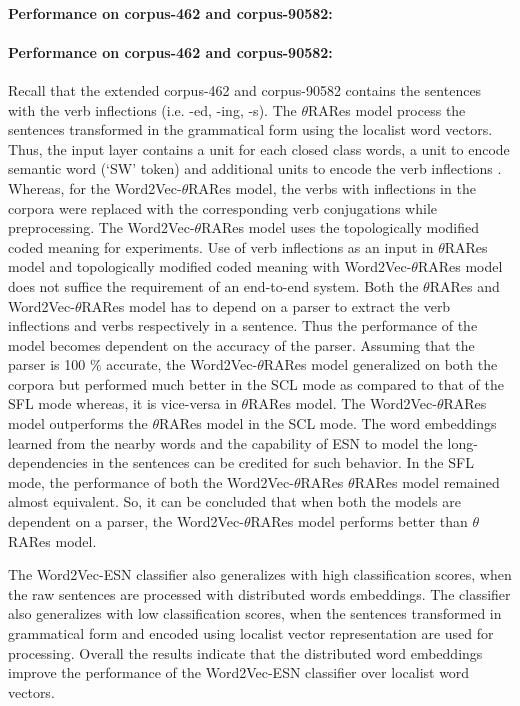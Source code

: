 \paragraph{Performance on corpus-462 and corpus-90582:} \paragraph{Performance on corpus-462 and corpus-90582:} Recall that the extended corpus-462 and corpus-90582 contains the sentences with the verb inflections (i.e. -ed, -ing, -s). The $\theta$RARes model process the sentences transformed in the grammatical form using the localist word vectors. Thus, the input layer contains a unit for each closed class words, a unit to encode semantic word (`SW' token) and additional units to encode the verb inflections \cite{xavier:2013:RT}. Whereas, for the Word2Vec-$\theta$RARes model, the verbs with inflections in the corpora were replaced with the corresponding verb conjugations while preprocessing. The Word2Vec-$\theta$RARes model uses the topologically modified coded meaning for experiments. Use of verb inflections as an input in $\theta$RARes model and topologically modified coded meaning with Word2Vec-$\theta$RARes model does not suffice the requirement of an end-to-end system. Both the $\theta$RARes and Word2Vec-$\theta$RARes model has to depend on a parser to extract the verb inflections and verbs respectively in a sentence. Thus the performance of the model becomes dependent on the accuracy of the parser. Assuming that the parser is 100 $\%$ accurate, the Word2Vec-$\theta$RARes model generalized on both the corpora but performed much better in the SCL mode as compared to that of the SFL mode whereas, it is vice-versa in $\theta$RARes model. The Word2Vec-$\theta$RARes model outperforms the $\theta$RARes model in the SCL mode. The word embeddings learned from the nearby words and the capability of ESN to model the long-dependencies in the sentences can be credited for such behavior. In the SFL mode, the performance of both the Word2Vec-$\theta$RARes $\theta$RARes model remained almost equivalent. So, it can be concluded that when both the models are dependent on a parser, the Word2Vec-$\theta$RARes model performs better than $\theta$RARes model.

The Word2Vec-ESN classifier also generalizes with high classification scores, when the raw sentences are processed with distributed words embeddings. The classifier also generalizes with low classification scores, when the sentences transformed in grammatical form and encoded using localist vector representation are used for processing. Overall the results indicate that the distributed word embeddings improve the performance of the Word2Vec-ESN classifier over localist word vectors.

